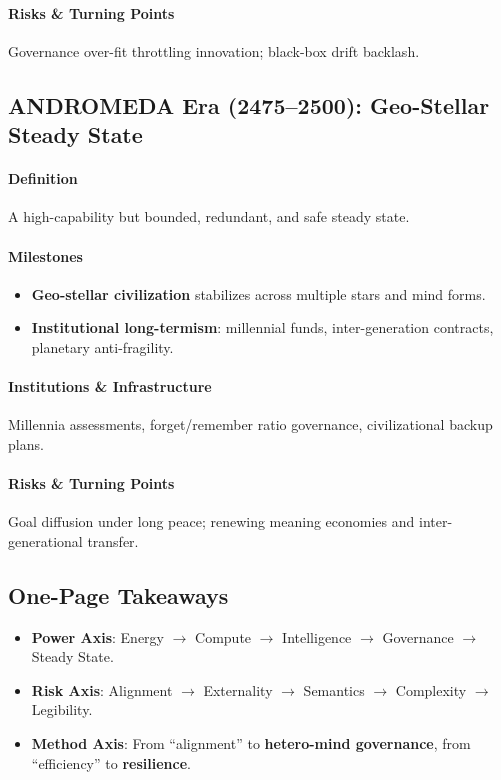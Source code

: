 \documentclass[11pt]{article}
\begin{document}
\paragraph{Risks \& Turning Points} Governance over-fit throttling innovation; black-box drift backlash.

\subsection{ANDROMEDA Era (2475–2500): Geo-Stellar Steady State}
\paragraph{Definition} A high-capability but bounded, redundant, and safe steady state.

\paragraph{Milestones}
\begin{itemize}[noitemsep]
  \item \textbf{Geo-stellar civilization} stabilizes across multiple stars and mind forms.
  \item \textbf{Institutional long-termism}: millennial funds, inter-generation contracts, planetary anti-fragility.
\end{itemize}

\paragraph{Institutions \& Infrastructure} Millennia assessments, forget/remember ratio governance, civilizational backup plans.

\paragraph{Risks \& Turning Points} Goal diffusion under long peace; renewing meaning economies and inter-generational transfer.

\subsection{One-Page Takeaways}
\begin{itemize}[noitemsep]
  \item \textbf{Power Axis}: Energy $\rightarrow$ Compute $\rightarrow$ Intelligence $\rightarrow$ Governance $\rightarrow$ Steady State.
  \item \textbf{Risk Axis}: Alignment $\rightarrow$ Externality $\rightarrow$ Semantics $\rightarrow$ Complexity $\rightarrow$ Legibility.
  \item \textbf{Method Axis}: From ``alignment'' to \textbf{hetero-mind governance}, from ``efficiency'' to \textbf{resilience}.
\end{itemize}
\end{document}
